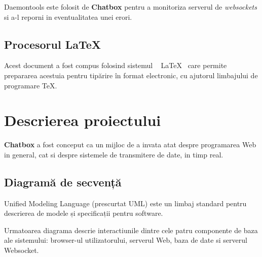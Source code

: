 \documentclass[12pt,a4paper]{article}
\begin{document}
Daemontools este folosit de \textbf{Chatbox} pentru a monitoriza serverul 
de \textit{websockets} si a-l reporni in eventualitatea unei erori.

\subsection{Procesorul \LaTeX}
Acest document a fost compus folosind sistemul ~ \LaTeX ~ care permite prepararea
acestuia pentru tipărire în format electronic,
cu ajutorul limbajului de programare \TeX.



\newpage
\section{Descrierea proiectului}
\textbf{Chatbox} a fost conceput ca un mijloc de a invata atat despre programarea
Web in general, cat si despre sistemele de transmitere de date, in timp real.

\subsection{Diagramă de secvență}
Unified Modeling Language (prescurtat UML) este un limbaj standard pentru descrierea de modele și specificații pentru software\cite{uml}.

Urmatoarea diagrama descrie interactiunile dintre cele patru componente 
de baza ale sistemului: browser-ul utilizatorului, serverul Web, baza de date si
serverul Websocket.
\end{document}
